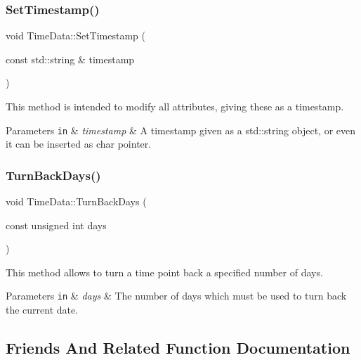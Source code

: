 \subsubsection{\texorpdfstring{Set\+Timestamp()}{SetTimestamp()}}
{\footnotesize\ttfamily void Time\+Data\+::\+Set\+Timestamp (\begin{DoxyParamCaption}\item[{const std\+::string \&}]{timestamp }\end{DoxyParamCaption})}



This method is intended to modify all attributes, giving these as a timestamp. 


\begin{DoxyParams}[1]{Parameters}
\mbox{\tt in}  & {\em timestamp} & A timestamp given as a {\ttfamily std\+::string} object, or even it can be inserted as {\ttfamily char} pointer. \\
\hline
\end{DoxyParams}
\mbox{\label{structTimeData_ad204062485d50c24aad1d4b41a582bd8}} 
\subsubsection{\texorpdfstring{Turn\+Back\+Days()}{TurnBackDays()}}
{\footnotesize\ttfamily void Time\+Data\+::\+Turn\+Back\+Days (\begin{DoxyParamCaption}\item[{const unsigned int}]{days }\end{DoxyParamCaption})}



This method allows to turn a time point back a specified number of days. 


\begin{DoxyParams}[1]{Parameters}
\mbox{\tt in}  & {\em days} & The number of days which must be used to turn back the current date. \\
\hline
\end{DoxyParams}


\subsection{Friends And Related Function Documentation}
\mbox{\label{structTimeData_a05ed1f021fd859fd0507d8ec74de5afd}} 

